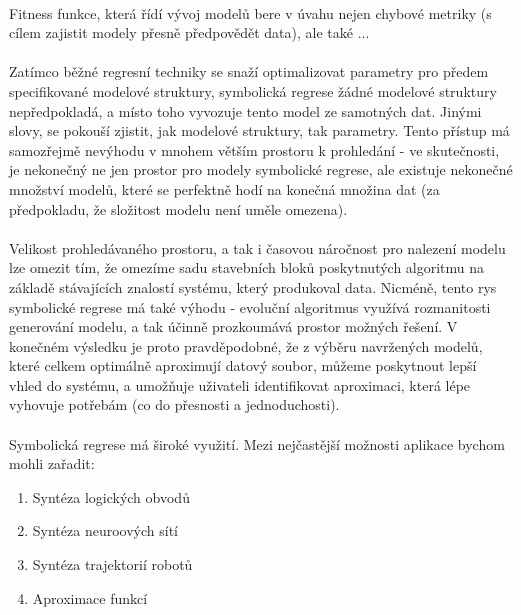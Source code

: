 \documentclass[bc,male,java,dept460]{diploma}		%
\begin{document}
\paragraph*{}
Fitness funkce, která řídí vývoj modelů bere v úvahu nejen chybové metriky (s cílem zajistit modely přesně předpovědět data), ale také ...

\paragraph*{}
Zatímco běžné regresní techniky se snaží optimalizovat parametry pro předem specifikované modelové struktury, symbolická regrese žádné modelové struktury nepředpokladá, a místo toho vyvozuje tento model ze samotných dat. Jinými slovy, se pokouší zjistit, jak modelové struktury, tak parametry. Tento přístup má samozřejmě nevýhodu v mnohem větším prostoru k prohledání - ve skutečnosti, je nekonečný ne jen prostor pro modely symbolické regrese, ale existuje nekonečné množství modelů, které se perfektně hodí na konečná množina dat (za předpokladu, že složitost modelu není uměle omezena). 


\paragraph*{}
Velikost prohledávaného prostoru, a tak i časovou náročnost pro nalezení modelu lze omezit tím, že omezíme sadu stavebních bloků poskytnutých algoritmu na základě stávajících znalostí systému, který produkoval data. Nicméně, tento rys symbolické regrese má také výhodu - evoluční algoritmus využívá rozmanitosti generování modelu, a tak účinně prozkoumává prostor možných řešení. V konečném výsledku je proto pravděpodobné, že z výběru navržených modelů, které celkem optimálně aproximují datový soubor, můžeme poskytnout lepší vhled do systému, a umožňuje uživateli identifikovat aproximaci, která lépe vyhovuje potřebám (co do přesnosti a jednoduchosti).

\paragraph*{}
Symbolická regrese má široké využití. Mezi nejčastější možnosti aplikace bychom mohli zařadit:
\begin{enumerate}
\item Syntéza logických obvodů
\item Syntéza neuroových sítí
\item Syntéza trajektorií robotů
\item Aproximace funkcí
\end{enumerate}
\end{document}
